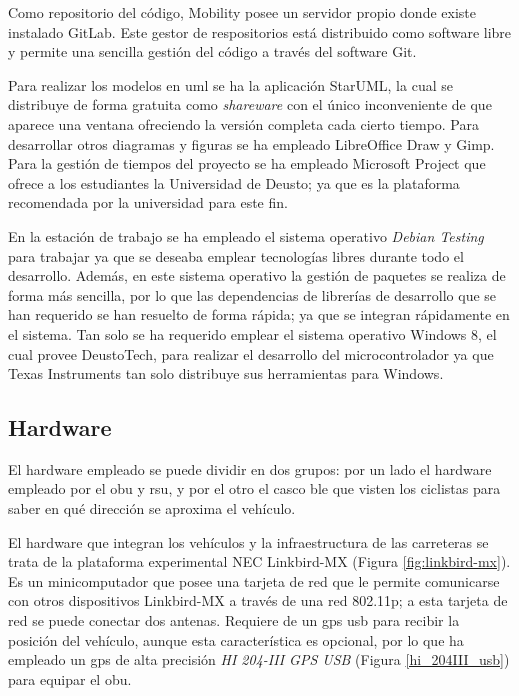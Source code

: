 Como repositorio del código, Mobility posee un servidor propio donde existe
instalado GitLab. Este gestor de respositorios está distribuido como software
libre y permite una sencilla gestión del código a través del software Git.

Para realizar los modelos en \gls{uml} se ha la aplicación StarUML, la cual
se distribuye de forma gratuita como \emph{shareware} con el único inconveniente
de que aparece una ventana ofreciendo la versión completa cada cierto tiempo.
Para desarrollar otros diagramas y figuras se ha empleado LibreOffice Draw y
Gimp. Para la gestión de tiempos del proyecto se ha empleado Microsoft Project
que ofrece a los estudiantes la Universidad de Deusto; ya que es la plataforma
recomendada por la universidad para este fin.

En la estación de trabajo se ha empleado el sistema operativo \emph{Debian
Testing} para trabajar ya que se deseaba emplear tecnologías libres durante
todo el desarrollo. Además, en este sistema operativo la gestión de paquetes
se realiza de forma más sencilla, por lo que las dependencias de librerías de
desarrollo que se han requerido se han resuelto de forma rápida; ya que se
integran rápidamente en el sistema. Tan solo se ha requerido emplear el sistema
operativo Windows 8, el cual provee DeustoTech, para realizar el desarrollo
del microcontrolador ya que Texas Instruments tan solo distribuye sus
herramientas para Windows.

\subsection{Hardware}
El hardware empleado se puede dividir en dos grupos: por un lado el hardware
empleado por el \gls{obu} y \gls{rsu}, y por el otro el casco \gls{ble} que
visten los ciclistas para saber en qué dirección se aproxima el vehículo.

El hardware que integran los vehículos y la infraestructura de las carreteras
se trata de la plataforma experimental NEC Linkbird-MX (Figura
\ref{fig:linkbird-mx}). Es un minicomputador que posee una tarjeta de red que
le permite comunicarse con otros dispositivos Linkbird-MX a través de una red
\Gls{802.11p}; a esta tarjeta de red se puede conectar dos antenas. Requiere
de un \gls{gps} \gls{usb} para recibir la posición del vehículo, aunque esta
característica es opcional, por lo que ha empleado un \gls{gps} de alta
precisión \emph{HI 204-III GPS USB} (Figura \ref{hi_204III_usb}) para equipar
el \gls{obu}.

